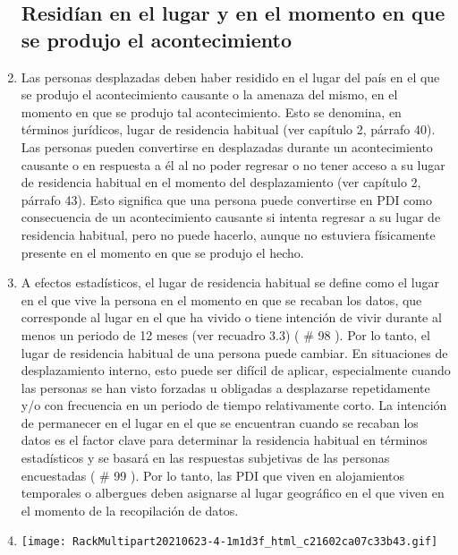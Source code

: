 \documentclass[
]{book}
\begin{document}
\begin{enumerate}
{  \subsection{Residían en el lugar y en el momento en que se produjo el acontecimiento}\label{residuxedan-en-el-lugar-y-en-el-momento-en-que-se-produjo-el-acontecimiento}}
\item
  Las personas desplazadas deben haber residido en el lugar del país en el que se produjo el acontecimiento causante o la amenaza del mismo, en el momento en que se produjo tal acontecimiento. Esto se denomina, en términos jurídicos, lugar de residencia habitual (ver capítulo 2, párrafo 40). Las personas pueden convertirse en desplazadas durante un acontecimiento causante o en respuesta a él al no poder regresar o no tener acceso a su lugar de residencia habitual en el momento del desplazamiento (ver capítulo 2, párrafo 43). Esto significa que una persona puede convertirse en PDI como consecuencia de un acontecimiento causante si intenta regresar a su lugar de residencia habitual, pero no puede hacerlo, aunque no estuviera físicamente presente en el momento en que se produjo el hecho.
\item
  A efectos estadísticos, el lugar de residencia habitual se define como el lugar en el que vive la persona en el momento en que se recaban los datos, que corresponde al lugar en el que ha vivido o tiene intención de vivir durante al menos un periodo de 12 meses (ver recuadro 3.3) (
  \# 98
  ). Por lo tanto, el lugar de residencia habitual de una persona puede cambiar. En situaciones de desplazamiento interno, esto puede ser difícil de aplicar, especialmente cuando las personas se han visto forzadas u obligadas a desplazarse repetidamente y/o con frecuencia en un periodo de tiempo relativamente corto. La intención de permanecer en el lugar en el que se encuentran cuando se recaban los datos es el factor clave para determinar la residencia habitual en términos estadísticos y se basará en las respuestas subjetivas de las personas encuestadas (
  \# 99
  ). Por lo tanto, las PDI que viven en alojamientos temporales o albergues deben asignarse al lugar geográfico en el que viven en el momento de la recopilación de datos.
\item
  \texttt{[image: RackMultipart20210623-4-1m1d3f\_html\_c21602ca07c33b43.gif]}

\end{enumerate}
\end{document}
